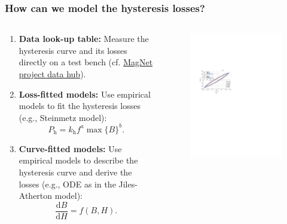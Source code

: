 \begin{frame}
	\frametitle{How can we model the hysteresis losses?}
	\begin{columns}
		\begin{column}{0.5\textwidth}
            \vspace{-0.15cm}
            \begin{enumerate}
                \item \textbf{Data look-up table:} Measure the hysteresis curve and its losses directly on a test bench (cf. \href{https://www.princeton.edu/~minjie/magnet.html}{MagNet project data hub}).
                \item<2-> \textbf{Loss-fitted models:} Use empirical models to fit the hysteresis losses (e.g., Steinmetz model):
                $$P_{\mathrm{h}} = k_{\mathrm{h}}f^a \max\{B\}^b.$$
                \item<3-> \textbf{Curve-fitted models:} Use empirical models to describe the hysteresis curve and derive the losses (e.g., ODE as in the Jiles-Atherton model):
                $$\frac{\mathrm{d}B}{\mathrm{d}H} = f(B,H).$$
            \end{enumerate}
		\end{column}
        \hfill
		\begin{column}{0.475\textwidth}
            \vspace{-0.2cm}
			\begin{figure}
				\centering
				\includegraphics[height=0.55\textheight]{fig/lec02/Hysteresis_curve_Serrano_et_al.pdf}

\end{figure}
\end{column}
\end{columns}
\end{frame}
